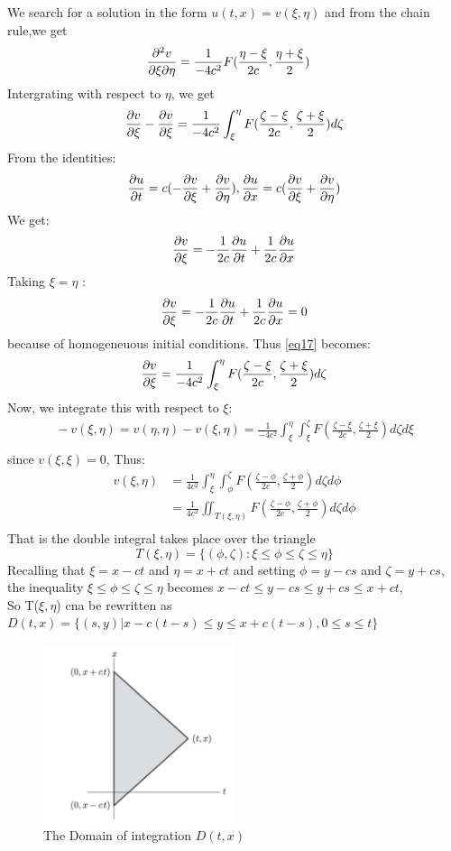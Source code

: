 We search for a solution in the form  $ u(t,x)=v(\xi,\eta) $ and from the chain rule,we get
\begin{align*}{}{}
\pdv{v}{\xi}{\eta} &=\frac{1}{-4c^2}F(\frac{\eta-\xi}{2c},\frac{\eta+\xi}{2})
\end{align*}
Intergrating with respect to $ \eta $, we get
$$
    \pdv{v}{\xi}(\xi,\eta)-\pdv{v}{\xi}(\xi,\xi)=\frac{1}{-4c^2}\int_{\xi}^{\eta}F(\frac{\zeta-\xi}{2c},\frac{\zeta+\xi}{2})d\zeta
$$ 
From the identities:
$$
    \pdv{u}{t}=c(-\pdv{v}{\xi}+\pdv{v}{\eta}),\pdv{u}{x}=c(\pdv{v}{\xi}+\pdv{v}{\eta})
$$ 
We get:
\begin{align*}{}{}
\pdv{v}{\xi}(\xi,\eta)=-\frac{1}{2c}\pdv{u}{t}(\frac{\eta-\xi}{2},\frac{\eta+\xi}{2})+\frac{1}{2c}\pdv{u}{x}(\frac{\eta-\xi}{2},\frac{\eta+\xi}{2})\\
\end{align*}
Taking $ \xi=\eta $ :
$$
    \pdv{v}{\xi}(\xi,\xi)=-\frac{1}{2c}\pdv{u}{t}(0,\xi)+\frac{1}{2c}\pdv{u}{x}(0,\xi)=0
$$ 
because of homogeneuous initial conditions. Thus \eqref{eq17} becomes:
$$
    \pdv{v}{\xi}(\xi,\eta)=\frac{1}{-4c^2}\int_{\xi}^{\eta}F(\frac{\zeta-\xi}{2c},\frac{\zeta+\xi}{2})d\zeta
$$ 
Now, we integrate this with respect to $ \xi $:
\begin{align*}{}{}
-v(\xi,\eta)=v(\eta,\eta)-v(\xi,\eta)=\frac{1}{-4c^2}\int_{\xi}^{\eta}\int_{\xi}^{\zeta}F(\frac{\zeta-\xi}{2c},\frac{\zeta+\xi}{2})d\zeta d\xi\\
\end{align*}
since $ v(\xi,\xi)=0 $, Thus:
\begin{align*}{}{}
v(\xi,\eta)&=\frac{1}{4c^2}\int_{\xi}^{\eta}\int_{\phi}^{\zeta}F(\frac{\zeta-\phi}{2c},\frac{\zeta+\phi}{2})d\zeta d\phi\\
&=\frac{1}{4c^2}{\iint}_{T(\xi,\eta)}F(\frac{\zeta-\phi}{2c},\frac{\zeta+\phi}{2})d\zeta d\phi\\
\end{align*}
That is the double integral takes place over the triangle$$
    T(\xi,\eta)=\{(\phi,\zeta):\xi\leq\phi\leq\zeta\leq\eta\}
$$ 
Recalling that $ \xi=x-ct $ and $ \eta=x+ct $ and setting $ \phi=y-cs $ and $ \zeta=y+cs $,
the inequality $ \xi\leq\phi\leq\zeta\leq\eta $   becomes $ x-ct\leq y-cs\leq y+cs\leq x+ct $, \\
So T($ \xi,\eta $) cna be rewritten as $ D(t,x)=\{(s,y)|x-c(t-s)\leq y\leq x+c(t-s),0\leq s\leq t\} $ 
\begin{figure}[H]
    \centering
    \includegraphics[height = 0.4\textwidth, width = 0.5\textwidth]{resource/4.png}
    \caption{The Domain of integration $ D(t,x) $}
\end{figure}
